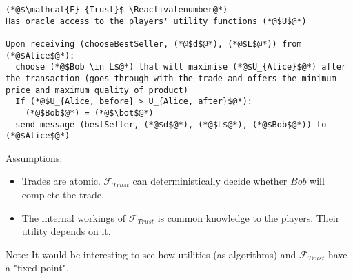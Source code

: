 \Suppressnumber
\begin{lstlisting}[label=trustfunc, style=numbers]
(*@$\mathcal{F}_{Trust}$ \Reactivatenumber@*)
Has oracle access to the players' utility functions (*@$U$@*)

Upon receiving (chooseBestSeller, (*@$d$@*), (*@$L$@*)) from (*@$Alice$@*):
  choose (*@$Bob \in L$@*) that will maximise (*@$U_{Alice}$@*) after the transaction (goes through with the trade and offers the minimum price and maximum quality of product)
  If (*@$U_{Alice, before} > U_{Alice, after}$@*):
    (*@$Bob$@*) = (*@$\bot$@*)
  send message (bestSeller, (*@$d$@*), (*@$L$@*), (*@$Bob$@*)) to (*@$Alice$@*)
\end{lstlisting}

Assumptions:
\begin{itemize}
  \item Trades are atomic. $\mathcal{F}_{Trust}$ can deterministically decide whether
  $Bob$ will complete the trade.
  \item The internal workings of $\mathcal{F}_{Trust}$ is common knowledge to the players.
  Their utility depends on it.
\end{itemize}
Note: It would be interesting to see how utilities (as algorithms) and
$\mathcal{F}_{Trust}$ have a "fixed point".
